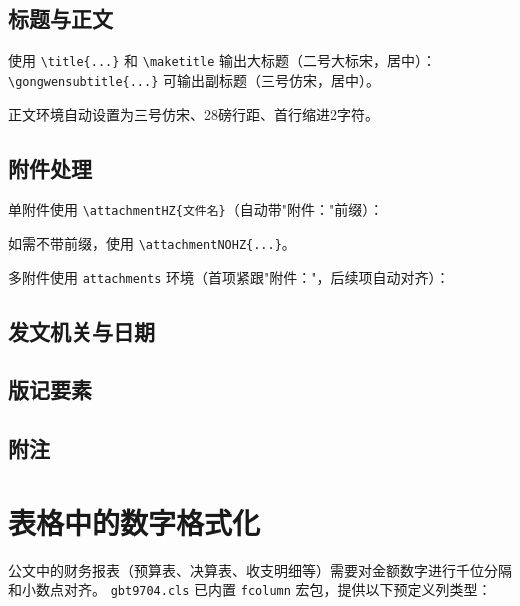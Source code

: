 \documentclass[redline, titleindent, zhlineskip]{gbt9704}
\begin{document}
\subsection{标题与正文}
使用 \verb|\title{...}| 和 \verb|\maketitle| 输出大标题（二号大标宋，居中）：
\verb|\gongwensubtitle{...}| 可输出副标题（三号仿宋，居中）。

正文环境自动设置为三号仿宋、28磅行距、首行缩进2字符。

\subsection{附件处理}
单附件使用 \verb|\attachmentHZ{文件名}|（自动带"附件："前缀）：

如需不带前缀，使用 \verb|\attachmentNOHZ{...}|。

多附件使用 \texttt{attachments} 环境（首项紧跟"附件："，后续项自动对齐）：
\begin{attachments}
\end{attachments}

\subsection{发文机关与日期}
\signature{中华人民共和国某部}

\subsection{版记要素}
\seprule
{}

\subsection{附注}

\section{表格中的数字格式化}

公文中的财务报表（预算表、决算表、收支明细等）需要对金额数字进行千位分隔和小数点对齐。
\texttt{gbt9704.cls} 已内置 \texttt{fcolumn} 宏包，提供以下预定义列类型：
\end{document}
